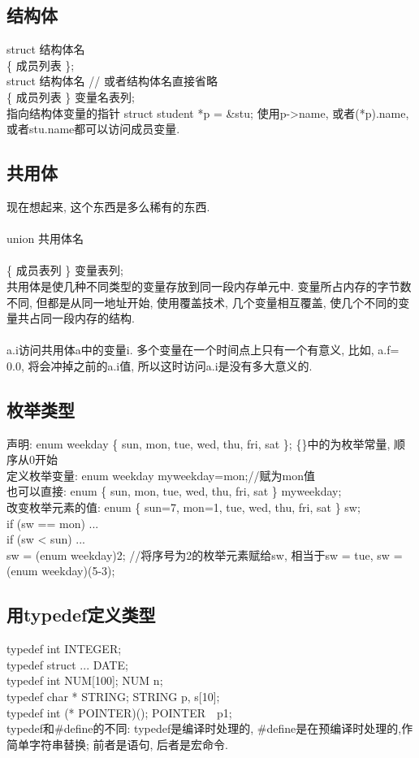 \documentclass[a4paper,10pt,english]{article}
\begin{document}
\subsection {结构体}
struct 结构体名 \\
\{ 成员列表 \}; \\
struct 结构体名  // 或者结构体名直接省略 \\
\{ 成员列表 \} 变量名表列; \\
指向结构体变量的指针 struct student *p = \&stu; 使用p->name, 或者(*p).name, 或者stu.name都可以访问成员变量.

\subsection {共用体}
现在想起来, 这个东西是多么稀有的东西. \\\\
union 共用体名 \\\\
\{ 成员表列 \} 变量表列; \\
共用体是使几种不同类型的变量存放到同一段内存单元中. 变量所占内存的字节数不同, 但都是从同一地址开始, 使用覆盖技术, 几个变量相互覆盖, 使几个不同的变量共占同一段内存的结构. \\\\
a.i访问共用体a中的变量i. 多个变量在一个时间点上只有一个有意义, 比如, a.f= 0.0, 将会冲掉之前的a.i值, 所以这时访问a.i是没有多大意义的.\\

\subsection {枚举类型}
声明: enum weekday \{ sun, mon, tue, wed, thu, fri, sat \}; \{\}中的为枚举常量, 顺序从0开始\\
定义枚举变量: enum weekday myweekday=mon;//赋为mon值 \\
也可以直接: enum \{ sun, mon, tue, wed, thu, fri, sat \} myweekday; \\
改变枚举元素的值: enum \{ sun=7, mon=1, tue, wed, thu, fri, sat \} sw; \\
if (sw == mon) ... \\
if (sw < sun) ... \\
sw = (enum weekday)2; //将序号为2的枚举元素赋给sw, 相当于sw = tue, sw = (enum weekday)(5-3);

\subsection {用typedef定义类型}
typedef int INTEGER; \\
typedef struct {...} DATE; \\
typedef int NUM[100]; NUM n; \\
typedef char * STRING; STRING p, s[10]; \\
typedef int (* POINTER)(); POINTER　p1; \\
typedef和\#define的不同: typedef是编译时处理的, \#define是在预编译时处理的,作简单字符串替换; 前者是语句, 后者是宏命令.
\end{document}
